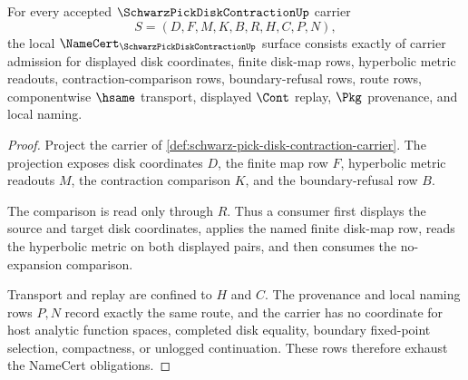 \begin{theorem}
\label{thm:schwarz-pick-disk-contraction-namecert-obligations}
For every accepted $\SchwarzPickDiskContractionUp$ carrier
$$
S=(D,F,M,K,B,R,H,C,P,N),
$$
the local $\NameCert_{\SchwarzPickDiskContractionUp}$ surface consists exactly of carrier admission for displayed disk coordinates, finite disk-map rows, hyperbolic metric readouts, contraction-comparison rows, boundary-refusal rows, route rows, componentwise $\hsame$ transport, displayed $\Cont$ replay, $\Pkg$ provenance, and local naming.
\end{theorem}
\begin{proof}
Project the carrier of \autoref{def:schwarz-pick-disk-contraction-carrier}. The projection exposes disk coordinates $D$, the finite map row $F$, hyperbolic metric readouts $M$, the contraction comparison $K$, and the boundary-refusal row $B$.

The comparison is read only through $R$. Thus a consumer first displays the source and target disk coordinates, applies the named finite disk-map row, reads the hyperbolic metric on both displayed pairs, and then consumes the no-expansion comparison.

Transport and replay are confined to $H$ and $C$. The provenance and local naming rows $P,N$ record exactly the same route, and the carrier has no coordinate for host analytic function spaces, completed disk equality, boundary fixed-point selection, compactness, or unlogged continuation. These rows therefore exhaust the NameCert obligations.
\end{proof}

